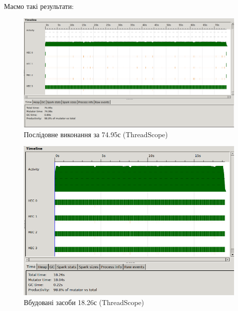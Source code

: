 \documentclass[12pt]{article}
\begin{document}
Маємо такі результати:\\

\begin{figure}[H]
  \includegraphics[width=\linewidth]{main0.png}
  \centering
  \caption{Послідовне виконання за 74.95с (ThreadScope)}
\end{figure}

\begin{figure}[H]
  \includegraphics[width=\linewidth]{main1.png}
  \centering
  \caption{Вбудовані засоби 18.26с (ThreadScope)}
\end{figure}
\end{document}
